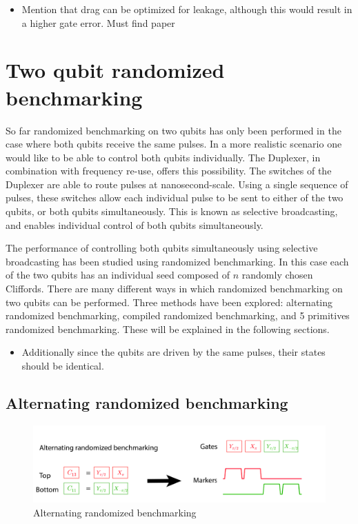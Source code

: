         \begin{itemize}
          \item Mention that drag can be optimized for leakage, although this would result in a higher gate error. Must find paper
        \end{itemize}

    \section{Two qubit randomized benchmarking}
      \label{Two qubit randomized benchmarking}
      So far randomized benchmarking on two qubits has only been performed in the case where both qubits receive the same pulses. In a more realistic scenario one would like to be able to control both qubits individually. The Duplexer, in combination with frequency re-use, offers this possibility. The switches of the Duplexer are able to route pulses at nanosecond-scale. Using a single sequence of pulses, these switches allow each individual pulse to be sent to either of the two qubits, or both qubits simultaneously. This is known as selective broadcasting, and enables individual control of both qubits simultaneously.

      The performance of controlling both qubits simultaneously using selective broadcasting has been studied using randomized benchmarking. In this case each of the two qubits has an individual seed composed of $n$ randomly chosen Cliffords. There are many different ways in which randomized benchmarking on two qubits can be performed. Three methods have been explored: alternating randomized benchmarking, compiled randomized benchmarking, and 5 primitives randomized benchmarking. These will be explained in the following sections.

      \begin{itemize}
        \item Additionally since the qubits are driven by the same pulses, their states should be identical.
      \end{itemize}

      \subsection{Alternating randomized benchmarking}
        \label{ssec:alternating randomized benchmarking}

        \begin{figure}[tb]
          \centering
          \includegraphics[width=\textwidth]{../Figures/Randomized benchmarking/alternating RB.jpg}
          \caption{Alternating randomized benchmarking}
          \label{fig:alternating RB schematic}
        \end{figure}

